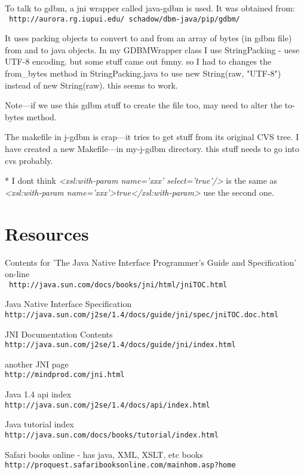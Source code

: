 \documentclass[a4paper,11pt]{article}
\begin{document}
To talk to gdbm, a jni wrapper called java-gdbm is used. It was
obtained from:\\ {\tt
http://aurora.rg.iupui.edu/~schadow/dbm-java/pip/gdbm/}

It uses packing objects to convert to and from an array of bytes (in
gdbm file) from and to java objects. In my GDBMWrapper class I use
StringPacking - uese UTF-8 encoding. but some stuff came out funny. so
I had to changes the from\_bytes method in StringPacking.java to use
new String(raw, "UTF-8") instead of new String(raw). this seems to
work.

Note---if we use this gdbm stuff to create the file too, may need to
alter the to-bytes method.

The makefile in j-gdbm is crap---it tries to get stuff from its
original CVS tree.  I have created a new Makefile---in my-j-gdbm
directory.  this stuff needs to go into cvs probably.

* I dont think {\em <xsl:with-param name='xxx' select='true'/>\/} is
the same as {\em <xsl:with-param name='xxx'>true</xsl:with-param>\/}
use the second one.


\section{Resources}

Contents for 'The Java Native Interface Programmer's Guide and
Specification' on-line\\ {\tt
http://java.sun.com/docs/books/jni/html/jniTOC.html}

Java Native Interface Specification\\
{\tt http://java.sun.com/j2se/1.4/docs/guide/jni/spec/jniTOC.doc.html}

JNI Documentation Contents\\
{\tt http://java.sun.com/j2se/1.4/docs/guide/jni/index.html}

another JNI page\\
{\tt http://mindprod.com/jni.html}

Java 1.4 api index\\
{\tt http://java.sun.com/j2se/1.4/docs/api/index.html}

Java tutorial index\\
{\tt http://java.sun.com/docs/books/tutorial/index.html}

Safari books online - has java, XML, XSLT, etc books\\
{\tt http://proquest.safaribooksonline.com/mainhom.asp?home}
\end{document}
